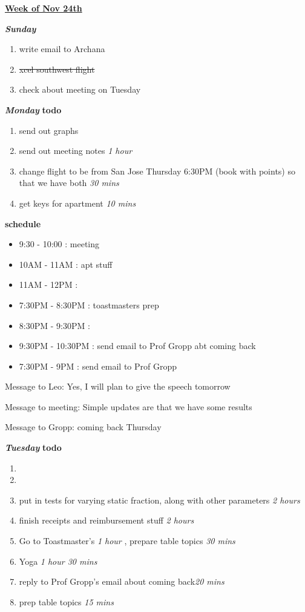 \documentclass[11pt]{article}
\newcommand{\doneTask}[1]{\item \sout{#1}}
\newcommand{\timeEst}[1]{\textit{#1}}
\begin{document}
\underline{\textbf{Week of Nov 24th}}

\textbf{\textit{Sunday}}
\begin{enumerate}
\item write email to Archana
\doneTask{ xcel southwest flight }
\item check about meeting on Tuesday
\end{enumerate}

\textbf{\textit{Monday}}
\textbf{todo}
\begin{enumerate}
\item send out graphs
\item send out meeting notes \timeEst{1 hour}

\item change flight to be from San Jose Thursday 6:30PM (book with points)  so that we have both \timeEst{30 mins}
\item get keys for apartment \timeEst{10 mins}
\end{enumerate}

\textbf{schedule}
\begin{itemize}
\item 9:30 - 10:00 : meeting
\item 10AM - 11AM : apt stuff
\item 11AM - 12PM :
\item 7:30PM - 8:30PM : toastmasters prep
\item 8:30PM - 9:30PM :
\item 9:30PM - 10:30PM : send email to Prof Gropp abt coming back
\item 7:30PM - 9PM : send email to Prof Gropp
\end{itemize}

Message to Leo: Yes, I will plan to give the speech tomorrow

Message to meeting: Simple updates are that we have some results

Message to Gropp: coming back Thursday

\textbf{\textit{Tuesday}}
\textbf{todo}
\begin{enumerate}

\item
\item
\item put in tests for varying static fraction, along with other parameters \timeEst{2 hours}
\item finish receipts and reimbursement stuff \timeEst{2 hours}
\item Go to Toastmaster's \timeEst{1 hour} , prepare table topics \timeEst{30 mins}
\item Yoga \timeEst{1 hour 30 mins}
\item reply to Prof Gropp's email about coming back\timeEst{20 mins}
\item prep table topics \timeEst{15 mins}
\end{enumerate}
\end{document}
